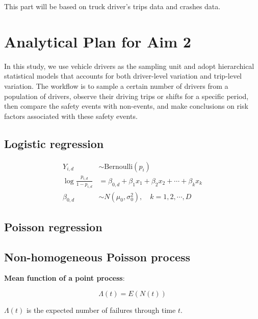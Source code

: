 \documentclass[12pt]{book}
\numberwithin{equation}{chapter}
\begin{document}
This part will be based on truck driver's trips data and crashes data.

\hypertarget{analytical-plan-for-aim-2}{%
\section{Analytical Plan for Aim 2}\label{analytical-plan-for-aim-2}}

In this study, we use vehicle drivers as the sampling unit and adopt hierarchical statistical models that accounts for both driver-level variation and trip-level variation. The workflow is to sample a certain number of drivers from a population of drivers, observe their driving trips or shifts for a specific period, then compare the safety events with non-events, and make conclusions on risk factors associated with these safety events.

\hypertarget{logistic-regression}{%
\subsection{Logistic regression}\label{logistic-regression}}

\begin{equation}
\begin{split}
Y_{i, d} &\sim \text{Bernoulli}(p_i)\\
\log\frac{p_{i, d}}{1-p_{i, d}} &= \beta_{0, d} + \beta_1x_1 + \beta_2x_2 + \cdots + \beta_kx_k\\
\beta_{0, d} &\sim N(\mu_0, \sigma_0^2), \quad k = 1, 2, \cdots, D
\label{eq:hierarchicallogit}
\end{split}
\end{equation}

\hypertarget{poisson-regression}{%
\subsection{Poisson regression}\label{poisson-regression}}

\hypertarget{non-homogeneous-poisson-process}{%
\subsection{Non-homogeneous Poisson process}\label{non-homogeneous-poisson-process}}

\textbf{Mean function of a point process}:

\[\Lambda(t) = E(N(t))\]

\(\Lambda(t)\) is the expected number of failures through time \(t\).
\end{document}
